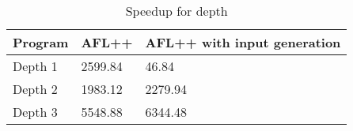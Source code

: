 \begin{table}
\caption{Speedup for depth}
\label{tab:depth_speedup}
\begin{tabular}{lll}
\toprule
Program & AFL++ & AFL++ with input generation \\
\midrule
Depth 1 & 2599.84 & 46.84 \\
Depth 2 & 1983.12 & 2279.94 \\
Depth 3 & 5548.88 & 6344.48 \\
\bottomrule
\end{tabular}
\end{table}
